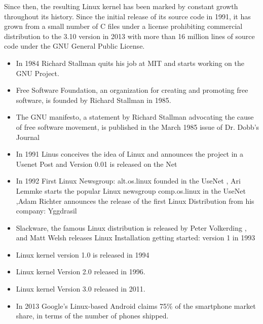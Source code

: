 \documentclass[11pt]{article} %
\begin{document}
Since then, the resulting Linux kernel has been marked by constant growth throughout its history. Since the initial release of its source code in 1991, it has grown from a small number of C files under a license prohibiting commercial distribution to the 3.10 version in 2013 with more than 16 million lines of source code under the GNU General Public License.
\begin{itemize}
\item  In 1984 Richard Stallman quits his job at MIT and starts working on the GNU Project.
\item Free Software Foundation, an organization for creating and promoting free software, is founded by Richard Stallman in 1985.
\item The GNU manifesto, a statement by Richard Stallman advocating the cause of free software movement, is published in the March 1985 issue of Dr. Dobb's Journal

\item
In 1991 	Linus conceives the idea of Linux and announces the project in a Usenet Post and Version 0.01 is released on the Net
\item  In 1992 	First Linux Newsgroup: alt.os.linux founded in the UseNet
, Ari Lemmke starts the popular Linux newsgroup comp.os.linux in the UseNet
,Adam Richter announces the release of the first Linux Distribution from his company: Yggdrasil

\item Slackware, the famous Linux distribution is released by Peter Volkerding , and Matt Welsh releases Linux Installation getting  started: version 1 in 1993
\item Linux kernel version 1.0 is released in 1994
\item   Linux kernel Version 2.0  released in 1996.
\item  Linux kernel Version 3.0  released in 2011.

\item In 2013 Google's Linux-based Android claims 75\% of the smartphone market share, in terms of the number of phones shipped.
\end{itemize}
\end{document}
